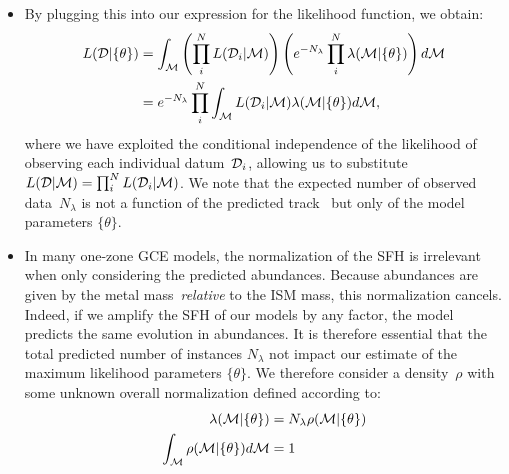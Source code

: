 \documentclass[ms.tex]{subfiles}
\begin{document}
\begin{itemize}
	\item By plugging this into our expression for the likelihood function,
	we obtain:
	\begin{subequations}\begin{align}
	L(\mathcal{D} | \{\theta\}) &=
	\int_{\mathcal{M}} \left(\prod_i^N L(\mathcal{D}_i | \mathcal{M})\right)
	\left(e^{-N_\lambda}\prod_i^N \lambda(\mathcal{M} | \{\theta\})\right)
	d\mathcal{M}
	\\
	&= e^{-N_\lambda} \prod_i^N \int_{\mathcal{M}}
	L(\mathcal{D}_i | \mathcal{M}) \lambda(\mathcal{M} | \{\theta\}) d\mathcal{M},
	\end{align}\end{subequations}
	where we have exploited the conditional independence of the likelihood of
	observing each individual datum~$\mathcal{D}_i$, allowing us to substitute
	$L(\mathcal{D} | \mathcal{M}) = \prod_i^N L(\mathcal{D}_i | \mathcal{M})$.
	We note that the expected number of observed data~$N_\lambda$ is not a
	function of the predicted track~ but only of the model parameters
	$\{\theta\}$.

	\item In many one-zone GCE models, the normalization of the SFH is
	irrelevant when only considering the predicted abundances.
	Because abundances are given by the metal mass~\textit{relative} to the ISM
	mass, this normalization cancels.
	Indeed, if we amplify the SFH of our models by any factor, the model
	predicts the same evolution in abundances.
	It is therefore essential that the total predicted number of instances
	$N_\lambda$ not impact our estimate of the maximum likelihood parameters
	$\{\theta\}$.
	We therefore consider a density~$\rho$ with some unknown overall
	normalization defined according to:
	\begin{subequations}\begin{align}
	\label{eq:rho_def}
	\lambda(\mathcal{M} | \{\theta\}) &= N_\lambda \rho(\mathcal{M} | \{\theta\})
	\\
	\label{eq:rho_integrated}
	\int_{\mathcal{M}} \rho(\mathcal{M} | \{\theta\}) d\mathcal{M} &= 1
	\end{align}\end{subequations}
	

\end{itemize}
\end{document}
